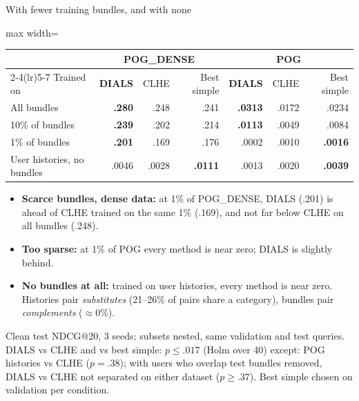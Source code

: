 \documentclass[10pt,aspectratio=169]{beamer}
\newcommand{\key}[1]{\textcolor{Accent}{\textbf{#1}}}
\newcommand{\fn}[1]{\textcolor{Muted}{\scriptsize #1}}
\begin{document}
\begin{frame}{With fewer training bundles, and with none}
\centering\renewcommand{\arraystretch}{1.25}\small
\begin{adjustbox}{max width=\textwidth}\begin{tabular}{lrrrrrr}\toprule
& \multicolumn{3}{c}{POG\_DENSE} & \multicolumn{3}{c}{POG}\\\cmidrule(lr){2-4}\cmidrule(lr){5-7}
Trained on & \key{DIALS} & CLHE & Best simple & \key{DIALS} & CLHE & Best simple\\\midrule
All bundles & \textbf{.280} & .248 & .241 & \textbf{.0313} & .0172 & .0234\\
10\% of bundles & \textbf{.239} & .202 & .214 & \textbf{.0113} & .0049 & .0084\\
1\% of bundles & \textbf{.201} & .169 & .176 & \textcolor{Warn}{.0002} & .0010 & \textbf{.0016}\\
User histories, no bundles & \textcolor{Warn}{.0046} & .0028 & \textbf{.0111} & \textcolor{Warn}{.0013} & .0020 & \textbf{.0039}\\\bottomrule
\end{tabular}\end{adjustbox}\par
\raggedright\vspace{2mm}
\begin{itemize}\setlength\itemsep{2pt}\small
\item \key{Scarce bundles, dense data:} at 1\% of POG\_DENSE, DIALS (.201) is ahead of CLHE trained on the same 1\% (.169), and not far below CLHE on all bundles (.248).
\item \key{Too sparse:} at 1\% of POG every method is near zero; DIALS is slightly behind.
\item \key{No bundles at all:} trained on user histories, every method is near zero. Histories pair \emph{substitutes} (21--26\% of pairs share a category), bundles pair \emph{complements} ($\approx$0\%).
\end{itemize}
\fn{Clean test NDCG@20, 3 seeds; subsets nested, same validation and test queries. DIALS vs CLHE and vs best simple: $p\le.017$ (Holm over 40) except: POG histories vs CLHE ($p=.38$); with users who overlap test bundles removed, DIALS vs CLHE not separated on either dataset ($p\ge.37$). Best simple chosen on validation per condition.}
\end{frame}

\end{document}
